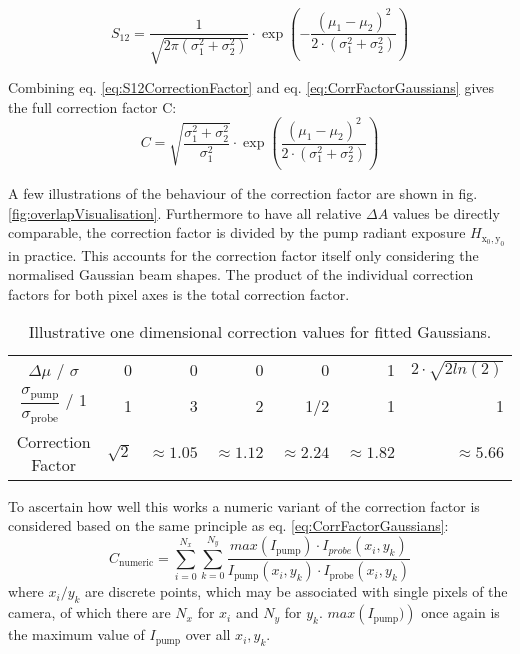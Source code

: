 \documentclass[twoside,openright,listof=numbered]{scrreprt}
\def\radiantExp{\ensuremath{H_\mathrm{x_0,y_0}}}
\begin{document}
\begin{equation}\label{eq:S12CorrectionFactor}
S_{12} = \dfrac{1}{\sqrt{2\pi\left(\sigma_1^2+\sigma_2^2\right)}}\cdot \exp\left(-\dfrac{\left(\mu_1 - \mu_2\right)^2}{2\cdot \left(\sigma_1^2+\sigma_2^2\right)}\right)
\end{equation}

Combining eq. \ref{eq:S12CorrectionFactor} and eq. \ref{eq:CorrFactorGaussians} gives the full correction factor C:
\begin{equation}\label{eq:fullCorrectionFactor}
C = \sqrt{\frac{\sigma_1^2+\sigma_2^2}{\sigma_1^2}}\cdot \exp \left(\frac{\left(\mu_1-\mu_2\right)^2}{2\cdot \left(\sigma_1^2+\sigma_2^2\right)}\right)
\end{equation}

A few illustrations of the behaviour of the correction factor are shown in fig. \ref{fig:overlapVisualisation}. Furthermore to have all relative $\Delta A$ values be directly comparable, the correction factor is divided by the pump radiant exposure $\radiantExp$ in practice. This accounts for the correction factor itself only considering the normalised Gaussian beam shapes. The product of the individual correction factors for both pixel axes is the total correction factor.

\begin{table}[h]
\caption{Illustrative one dimensional correction values for fitted Gaussians.}
\centering
\begin{tabular}{c|rrrrrr}\toprule
$\Delta \mu$ / $\sigma$                     & 0          & 0             & 0              & 0             & 1              & $2\cdot\sqrt{2 ln(2)}$ \\
$\dfrac{\sigma_\text{pump}}{\sigma_\text{probe}}$ / 1 & 1          & 3             & 2              & 1/2           & 1              & 1                      \\
Correction Factor                           & $\sqrt{2}$ & $\approx1.05$ & $\approx 1.12$ & $\approx 2.24$ & $\approx 1.82$ & $\approx 5.66$ \\ \bottomrule       
\end{tabular}
\end{table}


To ascertain how well this works a numeric variant of the correction factor is considered based on the same principle as eq. \ref{eq:CorrFactorGaussians}:
\begin{equation}\label{eq:correctionNumeric}
C_\text{numeric} = \sum_{i=0}^{N_x}\sum_{k=0}^{N_y}\frac{max\left(I_\text{pump}\right)\cdot I_{probe}(x_i,y_k)}{I_\text{pump}(x_i,y_k)\cdot I_\text{probe}(x_i,y_k)}
\end{equation}
where ${x_i/y_k}$ are discrete points, which may be associated with single pixels of the camera, of which there are $N_x$ for $x_i$ and $N_y$ for $y_k$. $max\left(I_\text{pump})\right)$ once again is the maximum value of ${I_\text{pump}}$ over all ${x_i, y_k}$. 
\end{document}
